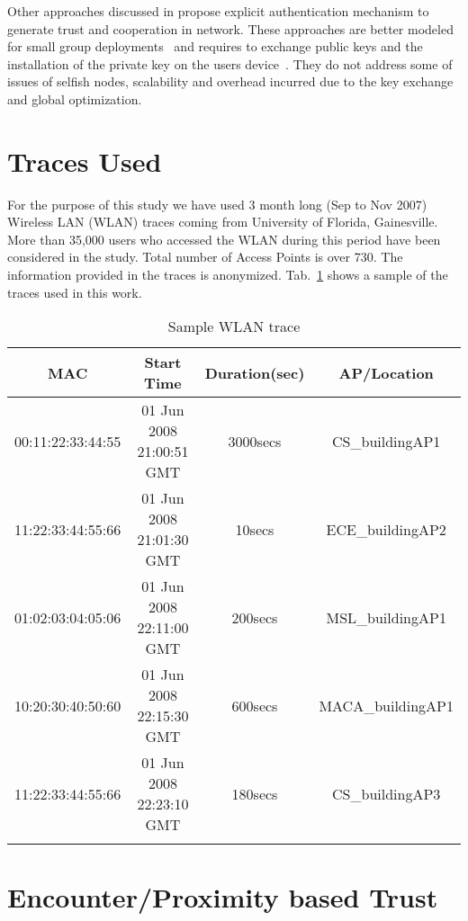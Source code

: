 \documentclass[10pt,conference]{IEEEtran}
\begin{document}
Other approaches discussed in \cite{spate,gangs,seeing} propose explicit authentication mechanism to generate trust and cooperation in network. These approaches are better modeled for small group deployments~\cite{spate} and requires to exchange public keys and the installation of the private key on the users device~\cite{gangs}. They do not address some of issues of selfish nodes, scalability and overhead incurred due to the key exchange and global optimization.






\section{Traces Used}
For the purpose of this study we have used 3 month long (Sep to Nov 2007) Wireless LAN (WLAN) traces coming from University of Florida, Gainesville. More than 35,000 users who accessed the WLAN during this period have been considered in the study. Total number of Access Points is over 730. The information provided in the traces is anonymized. Tab.~\ref{real_trace} shows a sample of the traces used in this work.



\begin{table}[htp]
\begin{center}
\tiny
\begin{tabular}{c c c c}
\hline MAC & Start Time & Duration(sec) & AP/Location \\
\hline 00:11:22:33:44:55 &   01 Jun 2008 21:00:51 GMT &     3000secs &   CS\_buildingAP1\\
11:22:33:44:55:66 &   01 Jun 2008 21:01:30 GMT &       10secs &   ECE\_buildingAP2 \\
01:02:03:04:05:06 &   01 Jun 2008 22:11:00 GMT &       200secs &   MSL\_buildingAP1 \\
10:20:30:40:50:60 &   01 Jun 2008 22:15:30 GMT &       600secs &   MACA\_buildingAP1 \\
11:22:33:44:55:66 &   01 Jun 2008 22:23:10 GMT &       180secs &   CS\_buildingAP3 \\
\hline \\
\end{tabular}\end{center} 
\caption{Sample WLAN trace}
\label{real_trace}
\end{table}




\section{Encounter/Proximity based Trust} \label {enct_trust}
\end{document}

